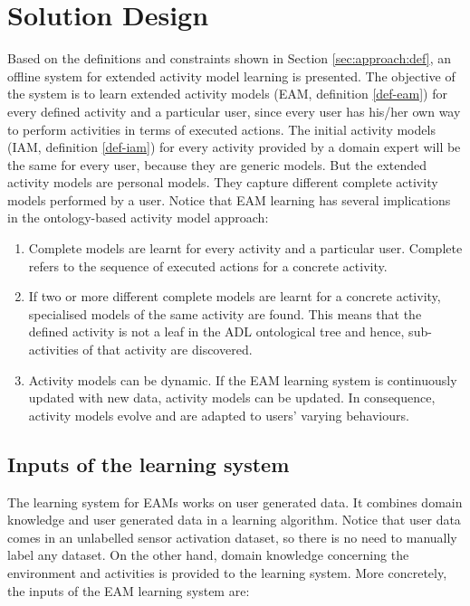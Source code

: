 \section{Solution Design}
\label{sec:approach:solution}

Based on the definitions and constraints shown in Section \ref{sec:approach:def}, an offline system for extended activity model learning is presented. The objective of the system is to learn extended activity models (EAM, definition \ref{def-eam}) for every defined activity and a particular user, since every user has his/her own way to perform activities in terms of executed actions. The initial activity models (IAM, definition \ref{def-iam}) for every activity provided by a domain expert will be the same for every user, because they are generic models. But the extended activity models are personal models. They capture different complete activity models performed by a user. Notice that EAM learning has several implications in the ontology-based activity model approach:

\begin{enumerate}
 \item Complete models are learnt for every activity and a particular user. Complete refers to the sequence of executed actions for a concrete activity.
 \item If two or more different complete models are learnt for a concrete activity, specialised models of the same activity are found. This means that the defined activity is not a leaf in the ADL ontological tree and hence, sub-activities of that activity are discovered.
 \item Activity models can be dynamic. If the EAM learning system is continuously updated with new data, activity models can be updated. In consequence, activity models evolve and are adapted to users' varying behaviours.
\end{enumerate}

\subsection{Inputs of the learning system}
\label{subsec:approach:inputs}

The learning system for EAMs works on user generated data. It combines domain knowledge and user generated data in a learning algorithm. Notice that user data comes in an unlabelled sensor activation dataset, so there is no need to manually label any dataset. On the other hand, domain knowledge concerning the environment and activities is provided to the learning system. More concretely, the inputs of the EAM learning system are:

